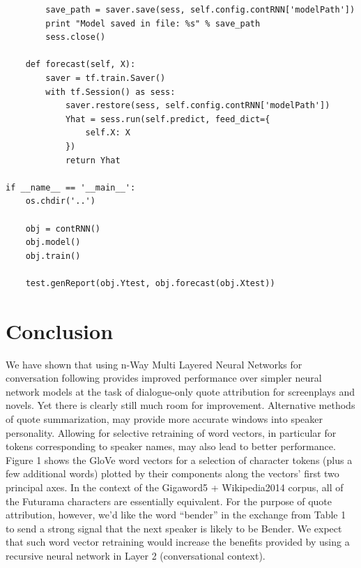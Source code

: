 \documentclass[BTech]{srmuthesis}
\begin{document}
\begin{verbatim}
        save_path = saver.save(sess, self.config.contRNN['modelPath'])
        print "Model saved in file: %s" % save_path
        sess.close()

    def forecast(self, X):
        saver = tf.train.Saver()
        with tf.Session() as sess:
            saver.restore(sess, self.config.contRNN['modelPath'])
            Yhat = sess.run(self.predict, feed_dict={
                self.X: X
            })
            return Yhat

if __name__ == '__main__':
    os.chdir('..')

    obj = contRNN()
    obj.model()
    obj.train()

    test.genReport(obj.Ytest, obj.forecast(obj.Xtest))

\end{verbatim}


\chapter{Conclusion}

We have shown that using n-Way Multi Layered Neural Networks for conversation following provides improved performance over simpler neural network models at the task of dialogue-only quote attribution for screenplays and novels. Yet there is clearly still much
room for improvement. Alternative methods of quote summarization, may provide more
accurate windows into speaker personality. Allowing for selective retraining of word vectors, in
particular for tokens corresponding to speaker names, may also lead to better performance. Figure 1
shows the GloVe word vectors for a selection of character tokens (plus a few additional words) plotted
by their components along the vectors’ first two principal axes. In the context of the Gigaword5
+ Wikipedia2014 corpus, all of the Futurama characters are essentially equivalent. For the purpose
of quote attribution, however, we’d like the word “bender” in the exchange from Table 1 to send a
strong signal that the next speaker is likely to be Bender. We expect that such word vector retraining
would increase the benefits provided by using a recursive neural network in Layer 2 (conversational
context).

  
\end{document}
